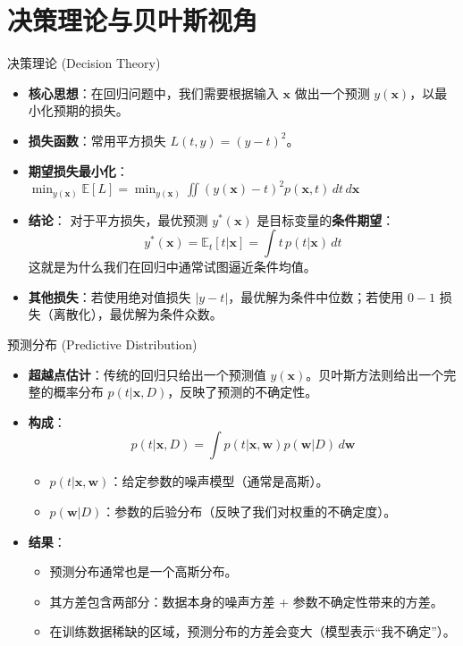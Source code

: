 \documentclass[12pt, aspectratio=169]{beamer}
\newcommand{\vect}[1]{\mathbf{#1}}
\newcommand{\E}{\mathbb{E}}
\begin{document}
\section{决策理论与贝叶斯视角}

\begin{frame}{决策理论 (Decision Theory)}
    \begin{itemize}
        \item \textbf{核心思想}：在回归问题中，我们需要根据输入 $\vect{x}$ 做出一个预测 $y(\vect{x})$，以最小化预期的损失。
        \item \textbf{损失函数}：常用平方损失 $L(t, y) = (y - t)^2$。
        \item \textbf{期望损失最小化}：
        $\displaystyle \min_{y(\vect{x})} \E[L] = \min_{y(\vect{x})} \iint (y(\vect{x}) - t)^2 p(\vect{x}, t) \, dt \, d\vect{x} $
        \item \textbf{结论}：
            对于平方损失，最优预测 $y^*(\vect{x})$ 是目标变量的\textbf{条件期望}：
            $$ y^*(\vect{x}) = \E_t[t|\vect{x}] = \int t \, p(t|\vect{x}) \, dt $$
            这就是为什么我们在回归中通常试图逼近条件均值。
        \item \textbf{其他损失}：若使用绝对值损失 $|y-t|$，最优解为条件中位数；若使用 $0-1$ 损失（离散化），最优解为条件众数。
    \end{itemize}
\end{frame}

\begin{frame}{预测分布 (Predictive Distribution)}
    \begin{itemize}
        \item \textbf{超越点估计}：传统的回归只给出一个预测值 $y(\vect{x})$。贝叶斯方法则给出一个完整的概率分布 $p(t|\vect{x}, D)$，反映了预测的不确定性。
        \item \textbf{构成}：
        $$ p(t|\vect{x}, D) = \int p(t|\vect{x}, \vect{w}) p(\vect{w}|D) \, d\vect{w} $$
        \begin{itemize}
            \item $p(t|\vect{x}, \vect{w})$：给定参数的噪声模型（通常是高斯）。
            \item $p(\vect{w}|D)$：参数的后验分布（反映了我们对权重的不确定度）。
        \end{itemize}
        \item \textbf{结果}：
        \begin{itemize}
            \item 预测分布通常也是一个高斯分布。
            \item 其方差包含两部分：数据本身的噪声方差 + 参数不确定性带来的方差。
            \item 在训练数据稀缺的区域，预测分布的方差会变大（模型表示“我不确定”）。
        \end{itemize}
    \end{itemize}
\end{frame}
\end{document}
